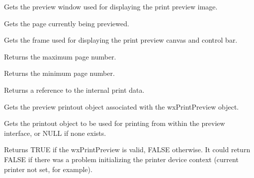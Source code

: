 \label{wxprintpreviewgetcanvas}


Gets the preview window used for displaying the print preview image.

\label{wxprintpreviewgetcurrentpage}


Gets the page currently being previewed.

\label{wxprintpreviewgetframe}


Gets the frame used for displaying the print preview canvas
and control bar.

\label{wxprintpreviewgetmaxpage}


Returns the maximum page number.

\label{wxprintpreviewgetminpage}


Returns the minimum page number.

\label{wxprintpreviewgetprintdata}


Returns a reference to the internal print data.

\label{wxprintpreviewgetprintout}


Gets the preview printout object associated with the wxPrintPreview object.

\label{wxprintpreviewgetprintoutforprinting}


Gets the printout object to be used for printing from within the preview interface,
or NULL if none exists.

\label{wxprintpreviewok}


Returns TRUE if the wxPrintPreview is valid, FALSE otherwise. It could return FALSE if there was a
problem initializing the printer device context (current printer not set, for example).

